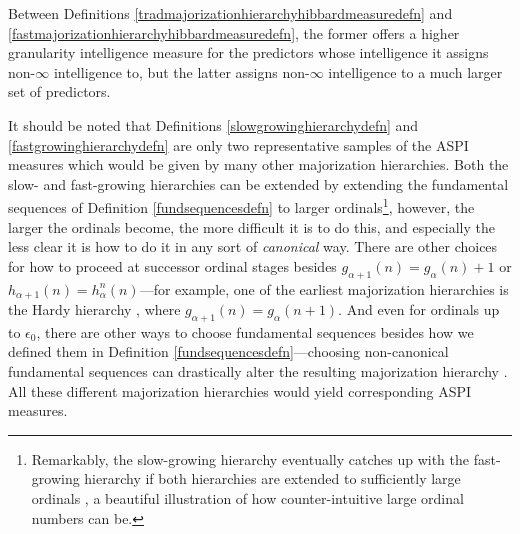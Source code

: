 \documentclass{article}
\begin{document}
Between Definitions \ref{tradmajorizationhierarchyhibbardmeasuredefn} and
\ref{fastmajorizationhierarchyhibbardmeasuredefn}, the former offers a higher
granularity
intelligence measure for the predictors whose intelligence it assigns non-$\infty$
intelligence to, but the latter assigns non-$\infty$ intelligence to a much larger
set of predictors.

It should be noted that Definitions \ref{slowgrowinghierarchydefn}
and \ref{fastgrowinghierarchydefn} are only two
representative samples of the ASPI measures which would be given by many other
majorization hierarchies. Both the slow- and fast-growing hierarchies can be
extended by extending the fundamental sequences of Definition
\ref{fundsequencesdefn} to larger ordinals\footnote{Remarkably,
the slow-growing hierarchy eventually catches up with the fast-growing hierarchy
if both hierarchies are extended to sufficiently large ordinals
\cite{girard1981pi12}, a beautiful illustration of how counter-intuitive
large ordinal numbers can be.}, however, the larger
the ordinals become, the more difficult it is to do this, and especially the less
clear it is how to do it in any sort of \emph{canonical} way.
There are other choices for how to proceed at successor ordinal stages besides
$g_{\alpha+1}(n)=g_\alpha(n)+1$ or $h_{\alpha+1}(n)=h^n_\alpha(n)$---for example,
one of the earliest majorization hierarchies is the Hardy hierarchy
\cite{hardy1904theorem}, where $g_{\alpha+1}(n)=g_\alpha(n+1)$.
And even for ordinals up to $\epsilon_0$,
there are other ways to choose fundamental sequences besides how we defined them in
Definition \ref{fundsequencesdefn}---choosing non-canonical fundamental sequences can
drastically alter the resulting majorization hierarchy \cite{weiermann1997sometimes}.
All these different majorization hierarchies would yield corresponding ASPI measures.



\end{document}
